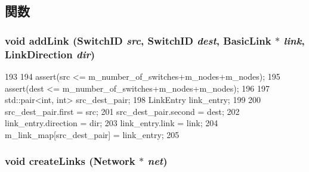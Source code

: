 \subsection{関数}
\hypertarget{classTopology_a259a2ab68e1f0dd5b79daa26031862f2}{
\subsubsection[{addLink}]{\setlength{\rightskip}{0pt plus 5cm}void addLink ({\bf SwitchID} {\em src}, \/  {\bf SwitchID} {\em dest}, \/  {\bf BasicLink} $\ast$ {\em link}, \/  LinkDirection {\em dir})}}
\label{classTopology_a259a2ab68e1f0dd5b79daa26031862f2}



\begin{DoxyCode}
193 {
194     assert(src <= m_number_of_switches+m_nodes+m_nodes);
195     assert(dest <= m_number_of_switches+m_nodes+m_nodes);
196     
197     std::pair<int, int> src_dest_pair;
198     LinkEntry link_entry;
199 
200     src_dest_pair.first = src;
201     src_dest_pair.second = dest;
202     link_entry.direction = dir;
203     link_entry.link = link;
204     m_link_map[src_dest_pair] = link_entry;
205 }
\end{DoxyCode}
\hypertarget{classTopology_a6d36a345f1cb410128c9fb5c653e17b1}{
\subsubsection[{createLinks}]{\setlength{\rightskip}{0pt plus 5cm}void createLinks ({\bf Network} $\ast$ {\em net})}}
\label{classTopology_a6d36a345f1cb410128c9fb5c653e17b1}




